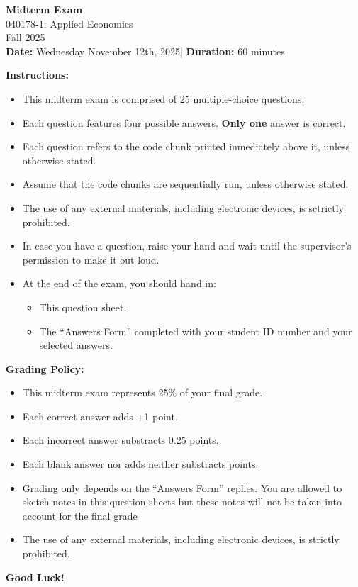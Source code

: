 \documentclass{article}
\newcommand{\examtitle}{Midterm Exam}
\newcommand{\coursename}{040178-1: Applied Economics}
\newcommand{\semester}{Fall 2025}
\newcommand{\examdate}{Wednesday November 12th, 2025}
\newcommand{\duration}{60 minutes}
\begin{document}
\begin{center}
    {\Large \textbf{\examtitle}} \\[6pt]
    \coursename \\[4pt]
    \semester \\[4pt]
    \textbf{Date:} \examdate \quad | \quad \textbf{Duration:} \duration
\end{center}

\vspace{1em}
\noindent
\textbf{Instructions:}
\begin{itemize}
    \item This midterm exam is comprised of 25 multiple-choice questions.
    \item Each question features four possible answers. \textbf{Only one} answer is correct.
    \item Each question refers to the code chunk printed inmediately above it, unless otherwise stated.
    \item Assume that the code chunks are sequentially run, unless otherwise stated.
    \item The use of any external materials, including electronic devices, is sctrictly prohibited.
    \item In case you have a question, raise your hand and wait until the supervisor's permission to make it out loud.
    \item At the end of the exam, you should hand in:
    \begin{itemize}
      \item This question sheet.
      \item The ``Answers Form'' completed with your student ID number and your selected answers.
    \end{itemize}
\end{itemize}
\textbf{Grading Policy:}
\begin{itemize}
    \item This midterm exam represents 25\% of your final grade.
    \item Each correct answer adds +1 point.
    \item Each incorrect answer substracts 0.25 points.
    \item Each blank answer nor adds neither substracts points.
    \item Grading only depends on the ``Answers Form'' replies. You are allowed to sketch notes in this question sheets but these notes will not be taken into account for the final grade
    \item The use of any external materials, including electronic devices, is strictly prohibited.
\end{itemize}
\textbf{Good Luck!}
\newpage
\end{document}
